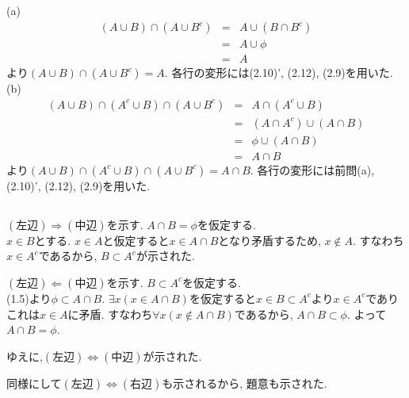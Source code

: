 \documentclass{jsarticle}
\begin{document}
\subsection{}	%
\noindent
(a)
\begin{eqnarray*}
	(A \cup B) \cap (A \cup B^c)
	&=& A \cup (B \cap B^c)\\
	&=& A \cup \phi\\
	&=& A
\end{eqnarray*}
より$(A \cup B) \cap (A \cup B^c) = A$. 各行の変形には(2.10)', (2.12), (2.9)を用いた.\\
(b)
\begin{eqnarray*}
	(A \cup B) \cap (A^c \cup B) \cap (A \cup B^c)
	&=& A \cap (A^c \cup B)\\
	&=& (A \cap A^c) \cup (A \cap B)\\
	&=& \phi \cup (A \cap B)\\
	&=& A \cap B
\end{eqnarray*}
より$(A \cup B) \cap (A^c \cup B) \cap (A \cup B^c) = A \cap B$. 各行の変形には前問(a), (2.10)', (2.12), (2.9)を用いた.\\

\subsection{}	%
$(左辺) \Rightarrow (中辺)$を示す. $A \cap B = \phi$を仮定する.\\
$x \in B$とする. $x \in A$と仮定すると$x \in A \cap B$となり矛盾するため, $x \notin A$. すなわち$x \in A^c$であるから, $B \subset A^c$が示された.

$(左辺) \Leftarrow (中辺)$を示す. $B \subset A^c$を仮定する.\\
(1.5)より$\phi \subset A \cap B$. $\exists{x}(x \in A \cap B)$を仮定すると$x \in B \subset A^c$より$x \in A^c$でありこれは$x \in A$に矛盾. すなわち$\forall{x}(x \notin A \cap B)$であるから, $A \cap B \subset \phi$. よって$A \cap B = \phi$.

ゆえに,$(左辺) \Leftrightarrow (中辺)$が示された.

同様にして$(左辺) \Leftrightarrow (右辺)$も示されるから, 題意も示された.
\end{document}
